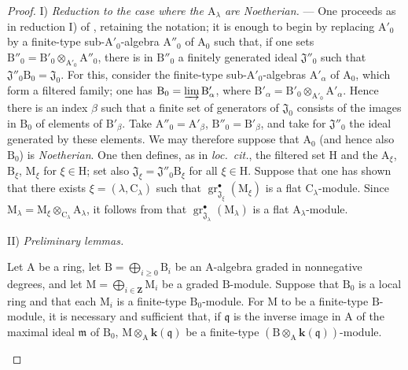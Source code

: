 \begin{proof}
\medskip
\noindent I) \emph{Reduction to the case where the $\mathrm{A}_\lambda$
are Noetherian.} --- One proceeds as in reduction I) of
, retaining the notation; it is enough to begin by replacing
$\mathrm{A}'_0$ by a finite-type sub-$\mathrm{A}'_0$-algebra
$\mathrm{A}''_0$ of $\mathrm{A}_0$ such that, if one sets
$\mathrm{B}''_0=\mathrm{B}'_0\otimes_{\mathrm{A}'_0}\mathrm{A}''_0$, there is
in $\mathrm{B}''_0$ a finitely generated ideal $\mathfrak{J}''_0$ such that
$\mathfrak{J}''_0\mathrm{B}_0=\mathfrak{J}_0$. For this, consider the
finite-type sub-$\mathrm{A}'_0$-algebras $\mathrm{A}'_\alpha$ of
$\mathrm{A}_0$, which form a filtered family; one has
$\mathrm{B}_0=\varinjlim\mathrm{B}'_\alpha$, where
$\mathrm{B}'_\alpha=\mathrm{B}'_0\otimes_{\mathrm{A}'_0}\mathrm{A}'_\alpha$.
Hence there is an index $\beta$ such that a finite set of generators of
$\mathfrak{J}_0$ consists of the images in $\mathrm{B}_0$ of elements of
$\mathrm{B}'_\beta$. Take $\mathrm{A}''_0=\mathrm{A}'_\beta$,
$\mathrm{B}''_0=\mathrm{B}'_\beta$, and take for $\mathfrak{J}''_0$ the ideal
generated by these elements. We may therefore suppose that $\mathrm{A}_0$
(and hence also $\mathrm{B}_0$) is \emph{Noetherian}. One then defines, as in
\emph{loc.\ cit.}, the filtered set $\mathrm{H}$ and the $\mathrm{A}_\xi$,
$\mathrm{B}_\xi$, $\mathrm{M}_\xi$ for $\xi\in\mathrm{H}$; set also
$\mathfrak{J}_\xi=\mathfrak{J}''_0\mathrm{B}_\xi$ for all
$\xi\in\mathrm{H}$. Suppose that one has shown that there exists
$\xi=(\lambda,\mathrm{C}_\lambda)$ such that
$\operatorname{gr}^\bullet_{\mathfrak{J}_\xi}(\mathrm{M}_\xi)$ is a flat
$\mathrm{C}_\lambda$-module. Since
$\mathrm{M}_\lambda=\mathrm{M}_\xi\otimes_{\mathrm{C}_\lambda}
\mathrm{A}_\lambda$, it follows from  that
$\operatorname{gr}^\bullet_{\mathfrak{J}_\lambda}(\mathrm{M}_\lambda)$ is a flat
$\mathrm{A}_\lambda$-module.

\medskip
\noindent II) \emph{Preliminary lemmas.}

\begin{lemma}[11.2.9.3]
\label{IV.11.2.9.3}
Let $\mathrm{A}$ be a ring, let
$\mathrm{B}=\bigoplus_{i\geqslant 0}\mathrm{B}_i$ be an
$\mathrm{A}$-algebra graded in nonnegative degrees, and let
$\mathrm{M}=\bigoplus_{i\in\mathbf{Z}}\mathrm{M}_i$ be a graded
$\mathrm{B}$-module. Suppose that $\mathrm{B}_0$ is a local ring and
that each $\mathrm{M}_i$ is a finite-type $\mathrm{B}_0$-module. For
$\mathrm{M}$ to be a finite-type $\mathrm{B}$-module, it is necessary
and sufficient that, if $\mathfrak{q}$ is the inverse image in
$\mathrm{A}$ of the maximal ideal $\mathfrak{m}$ of $\mathrm{B}_0$,
$\mathrm{M}\otimes_\mathrm{A}\boldsymbol{k}(\mathfrak{q})$ be a
finite-type
$(\mathrm{B}\otimes_\mathrm{A}\boldsymbol{k}(\mathfrak{q}))$-module.
\end{lemma}


\end{proof}
